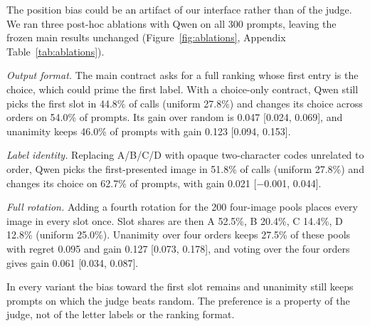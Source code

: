The position bias could be an artifact of our interface rather than of the judge. We ran three post-hoc ablations with Qwen on all 300 prompts, leaving the frozen main results unchanged (Figure~\ref{fig:ablations}, Appendix Table~\ref{tab:ablations}).

\textit{Output format.} The main contract asks for a full ranking whose first entry is the choice, which could prime the first label. With a choice-only contract, Qwen still picks the first slot in 44.8\% of calls (uniform 27.8\%) and changes its choice across orders on 54.0\% of prompts. Its gain over random is 0.047 [0.024, 0.069], and unanimity keeps 46.0\% of prompts with gain 0.123 [0.094, 0.153].

\textit{Label identity.} Replacing A/B/C/D with opaque two-character codes unrelated to order, Qwen picks the first-presented image in 51.8\% of calls (uniform 27.8\%) and changes its choice on 62.7\% of prompts, with gain 0.021 [$-$0.001, 0.044].

\textit{Full rotation.} Adding a fourth rotation for the 200 four-image pools places every image in every slot once. Slot shares are then A 52.5\%, B 20.4\%, C 14.4\%, D 12.8\% (uniform 25.0\%). Unanimity over four orders keeps 27.5\% of these pools with regret 0.095 and gain 0.127 [0.073, 0.178], and voting over the four orders gives gain 0.061 [0.034, 0.087].

In every variant the bias toward the first slot remains and unanimity still keeps prompts on which the judge beats random. The preference is a property of the judge, not of the letter labels or the ranking format.
